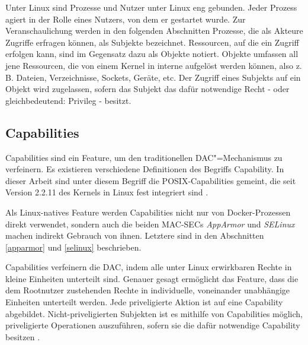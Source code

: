\documentclass[../main.tex]{subfiles}
\begin{document}
		Unter Linux sind Prozesse und Nutzer unter Linux eng gebunden. Jeder Prozess agiert in der Rolle eines Nutzers, von dem er gestartet wurde.	Zur Veranschaulichung werden in den folgenden Abschnitten Prozesse, die als Akteure Zugriffe erfragen können, als Subjekte bezeichnet. Ressourcen, auf die ein Zugriff erfolgen kann, sind im Gegensatz dazu als Objekte notiert. Objekte umfassen all jene Ressourcen, die von einem Kernel in interne  aufgelöst werden können, also z.\,B. Dateien, Verzeichnisse, Sockets, Geräte, etc. Der Zugriff eines Subjekts auf ein Objekt wird zugelassen, sofern das Subjekt das dafür notwendige Recht - oder gleichbedeutend: Privileg - besitzt.



    \subsection{Capabilities}
		\label{capabilities}
			Capabilities sind ein Feature, um den traditionellen DAC"=Mechanismus zu verfeinern. Es existieren verschiedene Definitionen des Begriffs \glqq{}Capability\grqq{}. In dieser Arbeit sind unter diesem Begriff die POSIX-Capabilities gemeint, die seit Version 2.2.11 des Kernels in Linux fest integriert sind \cite[S.42]{SELinuxApparmor}.

			Als Linux-natives Feature werden Capabilities nicht nur von Docker-Prozessen direkt verwendet, sondern auch die beiden \acrshort{MAC-SEC}s \emph{AppArmor} und \emph{SELinux} machen indirekt Gebrauch von ihnen. Letztere sind in den Abschnitten \ref{apparmor} und \ref{selinux} beschrieben.

			Capabilities verfeinern die DAC, indem alle unter Linux erwirkbaren Rechte in kleine Einheiten unterteilt sind. Genauer gesagt ermöglicht das Feature, dass die dem Rootnutzer zustehenden Rechte in individuelle, voneinander unabhängige Einheiten unterteilt werden. Jede priveligierte Aktion ist auf eine Capability abgebildet. Nicht-priveligierten Subjekten ist es mithilfe von Capabilities möglich, priveligierte Operationen auszuführen, sofern sie die dafür notwendige Capability besitzen \cite[S.33]{linuxInterface}\cite[S.39]{SELinuxApparmor}.
\end{document}
